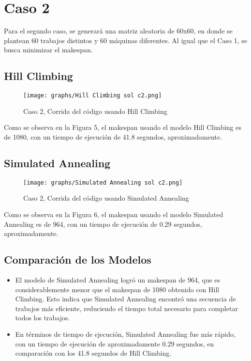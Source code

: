 \documentclass[11pt]{article}
\begin{document}
\section{Caso 2}
Para el segundo caso, se generará una matriz aleatoria de 60x60, en donde se plantean 60 trabajos distintos y 60 máquinas diferentes. Al igual que el Caso 1, se busca minimizar el makespan.   

\subsection{Hill Climbing}
\begin{figure}[H]
  \centering
  \texttt{[image: graphs/Hill Climbing sol c2.png]}
  \caption{Caso 2, Corrida del código usando Hill Climbing}
  \label{fig:miImagen}
\end{figure}

\noindent Como se observa en la Figura 5, el makespan usando el modelo Hill Climbing es de 1080, con un tiempo de ejecución de 41.8 segundos, aproximadamente.

\subsection{Simulated Annealing}
\begin{figure}[H]
  \centering
  \texttt{[image: graphs/Simulated Annealing sol c2.png]}
  \caption{Caso 2, Corrida del código usando Simulated Annealing}
  \label{fig:miImagen}
\end{figure}

\noindent Como se observa en la Figura 6, el makespan usando el modelo Simulated Annealing es de 964, con un tiempo de ejecución de 0.29 segundos, aproximadamente.

\subsection{Comparación de los Modelos} 
\begin{itemize}
\item El modelo de Simulated Annealing logró un makespan de 964, que es considerablemente menor que el makespan de 1080 obtenido con Hill Climbing. Esto indica que Simulated Annealing encontró una secuencia de trabajos más eficiente, reduciendo el tiempo total necesario para completar todos los trabajos.
\item En términos de tiempo de ejecución, Simulated Annealing fue más rápido, con un tiempo de ejecución de aproximadamente 0.29 segundos, en comparación con los 41.8 segundos de Hill Climbing.
\end{itemize}
\end{document}
